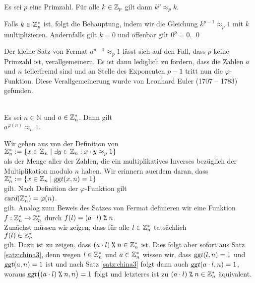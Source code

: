 \begin{Korollar}
  Es sei $p$ eine Primzahl.  F\"{u}r alle $k \in \mathbb{Z}_{p}$ gilt dann $k^p \approx_p k$.
\end{Korollar}

\proof
Falls $k \in \mathbb{Z}_{p}^*$ ist, folgt die Behauptung, indem wir die Gleichung $k^{p-1} \approx_p 1$
mit $k$ multiplizieren.  Andernfalls gilt $k= 0$ und offenbar gilt $0^p = 0$. \qed
\vspace*{0.3cm}

Der kleine Satz von Fermat $a^{p-1} \approx_p 1$ l\"{a}sst sich auf den Fall, dass $p$ keine Primzahl ist,
verallgemeinern.  Es ist dann lediglich zu fordern, dass die Zahlen $a$ und $n$ teilerfremd sind und an
Stelle des Exponenten $p - 1$ tritt nun die $\varphi$-Funktion.   Diese Verallgemeinerung wurde von Leonhard
Euler (1707 -- 1783) gefunden.


\begin{Satz} \hspace*{\fill} \\ 
Es sei $n \in \mathbb{N}$ und  $a \in \mathbb{Z}_{n}^*$. Dann gilt
\\[0.2cm]
\hspace*{1.3cm}
$a^{\varphi(n)} \approx_n 1$.  
\end{Satz}

\proof
Wir gehen aus von der Definition von
\\[0.2cm]
\hspace*{1.3cm}
$\mathbb{Z}_{n}^* := \{ x \in \mathbb{Z}_{n} \mid \exists y \in \mathbb{Z}_{n} : x \cdot y \approx_p 1 \}$
\\[0.2cm]
als der Menge aller der Zahlen, die ein multiplikatives Inverses bez\"{u}glich der Multiplikation modulo $n$
haben.  Wir erinnern au\3erdem daran, dass
\\[0.2cm]
\hspace*{1.3cm}
$\mathbb{Z}_{n}^* := \{ x \in \mathbb{Z}_{n} \mid \textsl{ggt}(x, n) = 1 \}$
\\[0.2cm]
gilt.  Nach Definition der $\varphi$-Funktion gilt
\\[0.2cm]
\hspace*{1.3cm}
$\textsl{card}(\mathbb{Z}_{n}^*) = \varphi(n)$.
\\[0.2cm]
gilt.  Analog zum Beweis des Satzes von Fermat definieren wir eine Funktion
\\[0.2cm]
\hspace*{1.3cm}
$f: \mathbb{Z}_{n}^* \rightarrow \mathbb{Z}_{n}^*$ \quad durch \quad $f(l) = (a \cdot l) \;\texttt{\%}\; n$.
\\[0.2cm]
Zun\"{a}chst m\"{u}ssen wir zeigen, dass f\"{u}r alle $l \in \mathbb{Z}_{n}^*$ tats\"{a}chlich 
\\[0.2cm]
\hspace*{1.3cm}
$f(l) \in \mathbb{Z}_{n}^*$
\\[0.2cm]
gilt.  Dazu ist zu zeigen, dass $(a \cdot l) \;\texttt{\%}\; n \in \mathbb{Z}_{n}^*$ ist.  
Dies folgt aber sofort aus Satz \ref{satz:china3}, denn
wegen $l \in \mathbb{Z}_{n}^*$ und $a \in \mathbb{Z}_{n}^*$ wissen wir, dass $\textsl{ggt}(l,n) = 1$ und
$\textsl{ggt}(a,n) = 1$ ist und nach Satz \ref{satz:china3} folgt dann auch 
$\textsl{ggt}(a \cdot l, n) = 1$, woraus $\textsl{ggt}\bigl((a \cdot l) \;\texttt{\%}\; n, n\bigr) = 1$
folgt und letzteres ist zu $(a \cdot l) \;\texttt{\%}\; n \in \mathbb{Z}_{n}^*$ \"{a}quivalent.



